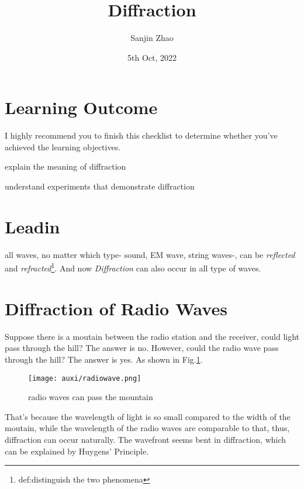 \documentclass[a4paper]{tufte-handout}
\title{Diffraction}
\author{Sanjin Zhao}
\date{5th Oct, 2022}  %
\begin{document}
\maketitle%
\section*{Learning Outcome}
I highly recommend you to finish this checklist to determine whether you've achieved the learning objectives.
\begin{todolist}
  \item explain the meaning of diffraction
  \item understand experiments that demonstrate diffraction
\end{todolist}
\clearpage

\section{Leadin}
all waves, no matter which type- sound, EM wave, string waves-, can be \emph{reflected} and \emph{refracted}\footnote{def:distinguish the two phenomena}. And now \emph{Diffraction} can also occur in all type of waves.

\section{Diffraction of Radio Waves}
Suppose there is a moutain between the radio station and the receiver, could light pass through the hill? The answer is no. However, could the radio wave pass through the hill? The answer is yes. As shown in Fig.\ref{fig:radiowave}.
\begin{figure}[h]
\centering
\texttt{[image: auxi/radiowave.png]}
\caption{radio waves can pass the mountain}
\label{fig:radiowave}
\end{figure}
That's because the wavelength of light is so small compared to the width of the moutain, while the wavelength of the radio waves are comparable to that, thus, diffraction can occur naturally. The wavefront seems bent in diffraction, which can be explained by Huygens' Principle.
\end{document}
